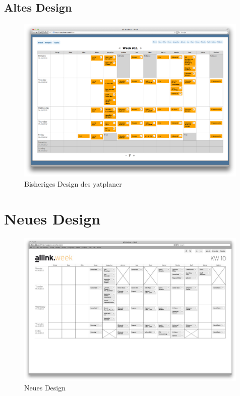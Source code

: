 \subsection{Altes Design}
\begin{figure}[!ht]
\begin{center}
\includegraphics[width=0.99\textwidth,angle=0]{./bilder/yatplaner.png}
\caption{Bisheriges Design des yatplaner}
\end{center}
\end{figure}

\clearpage
\section{Neues Design}
\begin{figure}[!ht]
\begin{center}
\includegraphics[width=0.99\textwidth,angle=0]{./bilder/wochenplaner.jpg}
\caption{Neues Design}
\end{center}
\end{figure}

